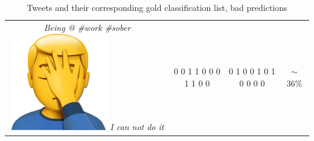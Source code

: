 \begin{table}[H]
{\begin{tabular}{c|c|c|c|}
\parbox[t]{6cm}{\textit{Being @ \#work \#sober \includegraphics[scale=0.07]{pictures/man_facepalm_emoji.png}
 I can not do it}} & 0 0 1 1 0 0 0 1 1 0 0 & 0 1 0 0 1 0 1 0 0 0 0 & $\sim$ 36\% \\
\end{tabular}}
\caption{Tweets and their corresponding gold classification list, bad predictions}
\label{tab:classerrorhigh}
\end{table}

